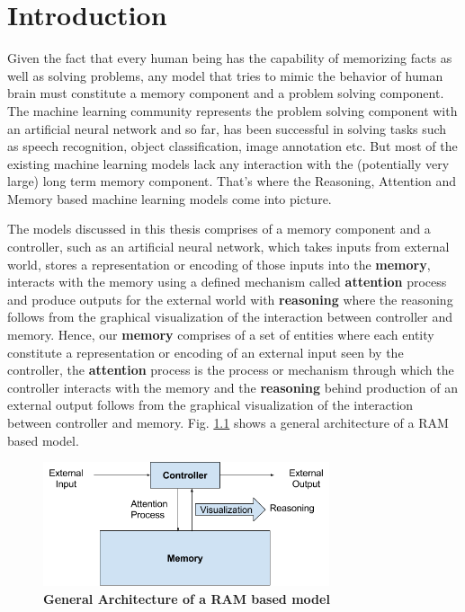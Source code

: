 \chapter{Introduction}
Given the fact that every human being has the capability of memorizing facts as well as solving problems, any model that tries to mimic the behavior of human brain must constitute a memory component and a problem solving component. The machine learning community represents the problem solving component with an artificial neural network and so far, has been successful in solving tasks such as speech recognition, object classification, image annotation etc. But most of the existing machine learning models lack any interaction with the (potentially very large) long term memory component. That's where the Reasoning, Attention and Memory based machine learning models come into picture.

The models discussed in this thesis comprises of a memory component and a controller, such as an artificial neural network, which takes inputs from external world, stores a representation or encoding of those inputs into the \textbf{memory}, interacts with the memory using a defined mechanism called \textbf{attention} process and produce outputs for the external world with \textbf{reasoning} where the reasoning follows from the graphical visualization of the interaction between controller and memory. Hence, our \textbf{memory} comprises of a set of entities where each entity constitute a representation or encoding of an external input seen by the controller, the \textbf{attention} process is the process or mechanism through which the controller interacts with the memory and the \textbf{reasoning} behind production of an external output follows from the graphical visualization of the interaction between controller and memory. Fig. \ref{fig:gen_arch_ram} shows a general architecture of a RAM based model.

\begin{figure}
\centering
\includegraphics[width=0.75\textwidth]{gen_arch_ram}
\caption{\textbf{General Architecture of a RAM based model}}
\label{fig:gen_arch_ram}
\end{figure}

